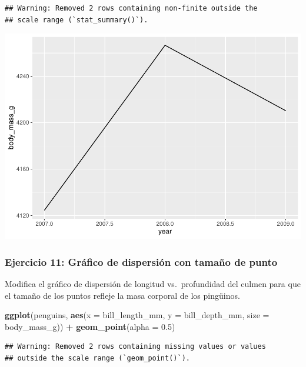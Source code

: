 \documentclass[
]{book}
\newenvironment{Shaded}{\begin{snugshade}}{\end{snugshade}}
\newcommand{\AttributeTok}[1]{\textcolor[rgb]{0.13,0.29,0.53}{#1}}
\newcommand{\FloatTok}[1]{\textcolor[rgb]{0.00,0.00,0.81}{#1}}
\newcommand{\FunctionTok}[1]{\textcolor[rgb]{0.13,0.29,0.53}{\textbf{#1}}}
\newcommand{\NormalTok}[1]{#1}
\newcommand{\SpecialCharTok}[1]{\textcolor[rgb]{0.81,0.36,0.00}{\textbf{#1}}}
\begin{document}
\begin{verbatim}
## Warning: Removed 2 rows containing non-finite outside the
## scale range (`stat_summary()`).
\end{verbatim}

\includegraphics{bookdown-demo_files/figure-latex/unnamed-chunk-192-1.pdf}

\subsubsection{Ejercicio 11: Gráfico de dispersión con tamaño de punto}\label{ejercicio-11-gruxe1fico-de-dispersiuxf3n-con-tamauxf1o-de-punto}

Modifica el gráfico de dispersión de longitud vs.~profundidad del culmen para que el tamaño de los puntos refleje la masa corporal de los pingüinos.

\begin{Shaded}
\begin{Highlighting}[]
\FunctionTok{ggplot}\NormalTok{(penguins, }\FunctionTok{aes}\NormalTok{(}\AttributeTok{x =}\NormalTok{ bill\_length\_mm, }\AttributeTok{y =}\NormalTok{ bill\_depth\_mm, }\AttributeTok{size =}\NormalTok{ body\_mass\_g)) }\SpecialCharTok{+}
  \FunctionTok{geom\_point}\NormalTok{(}\AttributeTok{alpha =} \FloatTok{0.5}\NormalTok{)}
\end{Highlighting}
\end{Shaded}

\begin{verbatim}
## Warning: Removed 2 rows containing missing values or values
## outside the scale range (`geom_point()`).
\end{verbatim}
\end{document}
